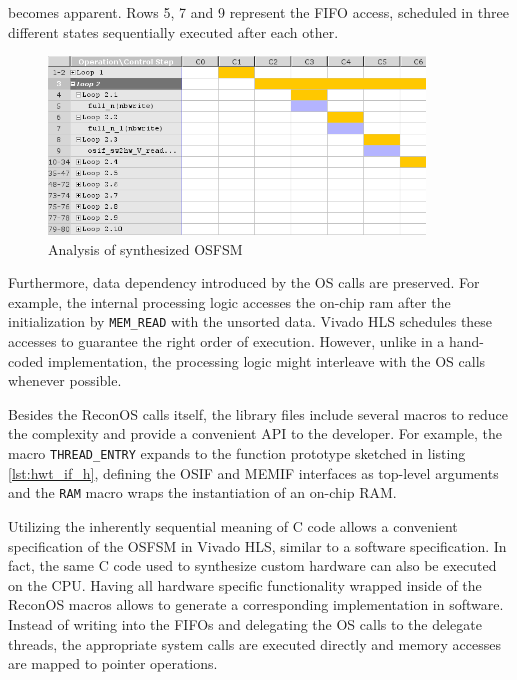 becomes apparent. Rows 5, 7 and 9 represent the \ac{FIFO} access, scheduled in
three different states sequentially executed after each other.
\begin{figure}[tb]
	\centering
	\includegraphics[width=10cm]{../figures/osfsm_a}
	\caption{Analysis of synthesized \acs{OSFSM}}
	\label{fig:osfsm_a}
\end{figure}
Furthermore, data dependency introduced by the \ac{OS} calls are preserved.
For example, the internal processing logic accesses the on-chip ram after the
initialization by \lstinline{MEM_READ} with the unsorted data. Vivado HLS
schedules these accesses to guarantee the right order of execution. However,
unlike in a hand-coded implementation, the processing logic might interleave
with the \ac{OS} calls whenever possible.

Besides the ReconOS calls itself, the library files include several macros to
reduce the complexity and provide a convenient \ac{API} to the developer. For
example, the macro \lstinline{THREAD_ENTRY} expands to the function prototype
sketched in listing \ref{lst:hwt_if_h}, defining the \ac{OSIF} and \ac{MEMIF}
interfaces as top-level arguments and the \lstinline{RAM} macro wraps the
instantiation of an on-chip \ac{RAM}.

Utilizing the inherently sequential meaning of C code allows a convenient
specification of the \ac{OSFSM} in Vivado HLS, similar to a software
specification. In fact, the same C code used to synthesize custom hardware can
also be executed on the \ac{CPU}. Having all hardware specific functionality
wrapped inside of the ReconOS macros allows to generate a corresponding
implementation in software. Instead of writing into the
\acp{FIFO} and delegating the \ac{OS} calls to the delegate threads, the
appropriate system calls are executed directly and memory accesses are mapped
to pointer operations.

